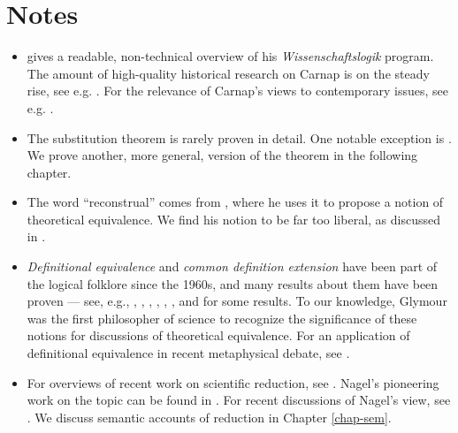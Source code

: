   
    












\section{Notes}


\begin{itemize}
\item \cite{carnap-pls} gives a readable, non-technical overview of
  his {\it Wissenschaftslogik} program.  The amount of high-quality
  historical research on Carnap is on the steady rise, see e.g.
  \cite{friedman,awodey2004,andreas,creath,hudson,friedman2011}.  For
  the relevance of Carnap's views to contemporary issues, see
  e.g. \cite{price2009,blatti}.
\item The substitution theorem is rarely proven in detail.  One
  notable exception is \cite{kleene}.  We prove another, more general,
  version of the theorem in the following chapter.
\item The word ``reconstrual'' comes from \cite{quine1975}, where he
  uses it to propose a notion of theoretical equivalence.  We find his
  notion to be far too liberal, as discussed in
  \cite{barrett-glymour}.
\item \emph{Definitional equivalence} and \emph{common definition
    extension} have been part of the logical folklore since the 1960s,
  and many results about them have been proven --- see, e.g.,
  \citet[\S 2.6]{hodges}, \cite{debouvere1965}, \cite{kanger1968},
  \cite{pinter1978}, \cite{pelletier2003}, \cite{andreka2005}, and
  \cite{strange} for some results.  To our knowledge, Glymour was the
  first philosopher of science to recognize the significance of these
  notions for discussions of theoretical equivalence.  For an
  application of definitional equivalence in recent metaphysical
  debate, see \cite{mcsweeney}.
\item For overviews of recent work on scientific reduction, see
  \citep{scheibe,riel,love-reduction,hudetz-thesis}.  Nagel's
  pioneering work on the topic can be found in
  \citep{nagel1935,nagel}.  For recent discussions of Nagel's view,
  see \citep{hartmann,sarkar}.  We discuss semantic accounts of
  reduction in Chapter \ref{chap-sem}.
\end{itemize}


